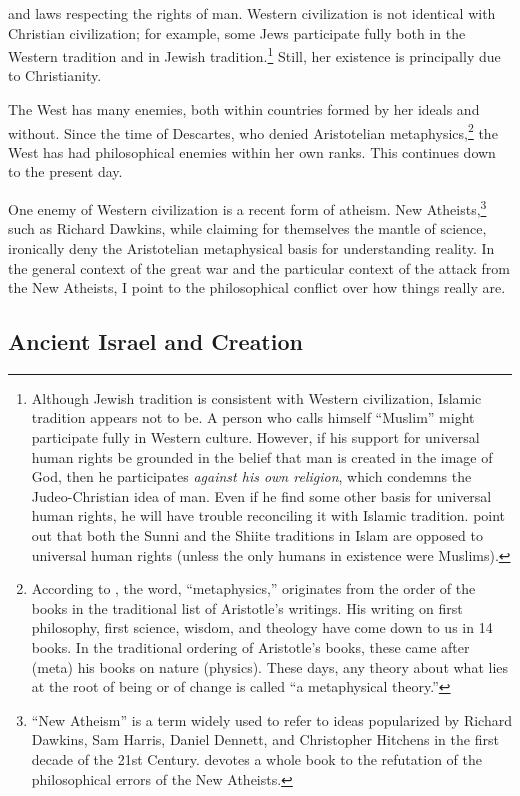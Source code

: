 \documentclass[twocolumn]{article}
\begin{document}
and laws respecting the rights of man.  Western civilization is not identical
with Christian civilization; for example, some Jews participate fully both in
the Western tradition and in Jewish tradition.\footnote{%
   Although Jewish tradition is consistent with Western civilization, Islamic
   tradition appears not to be.  A person who calls himself ``Muslim'' might
   participate fully in Western culture.  However, if his support for universal
   human rights be grounded in the belief that man is created in the image of
   God, then he participates \emph{against his own religion}, which condemns
   the Judeo-Christian idea of man.  Even if he find some other basis for
   universal human rights, he will have trouble reconciling it with Islamic
   tradition.  \cite{as2003} point out that both the Sunni and the Shiite
   traditions in Islam are opposed to universal human rights (unless the only
   humans in existence were Muslims).
}
Still, her existence is principally due to Christianity.

The West has many enemies, both within countries formed by her ideals and
without.  Since the time of Descartes, who denied Aristotelian
metaphysics,\footnote{%
   According to \cite{vis2017}, the word, ``metaphysics,'' originates from the
   order of the books in the traditional list of Aristotle's writings.  His
   writing on first philosophy, first science, wisdom, and theology have come
   down to us in 14 books.  In the traditional ordering of Aristotle's books,
   these came after (meta) his books on nature (physics).  These days, any
   theory about what lies at the root of being or of change is called ``a
   metaphysical theory.''%
}
the West has had philosophical enemies within her own ranks.  This continues
down to the present day.

One enemy of Western civilization is a recent form of atheism.  New
Atheists,\footnote{%
   ``New Atheism'' is a term widely used to refer to ideas popularized by
   Richard Dawkins, Sam Harris, Daniel Dennett, and Christopher Hitchens in the
   first decade of the 21st Century.  \cite{f2008} devotes a whole book to the
   refutation of the philosophical errors of the New Atheists.
}
such as Richard Dawkins, while claiming for themselves the mantle of science,
ironically deny the Aristotelian metaphysical basis for understanding reality.
In the general context of the great war and the particular context of the
attack from the New Atheists, I point to the philosophical conflict over how
things really are.

\subsection{Ancient Israel and Creation}
\end{document}
